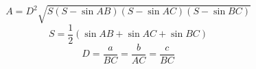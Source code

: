 \documentclass[12pt]{article}
\begin{document}
\[
    A = D^2\sqrt{S(S - \sin AB)(S - \sin AC)(S - \sin BC)}
\]
\[
S = \frac{1}{2}(\sin AB + \sin AC + \sin BC)
\]
\[
D = \frac{a}{BC} = \frac{b}{AC} = \frac{c}{BC}
\]
\end{document}
